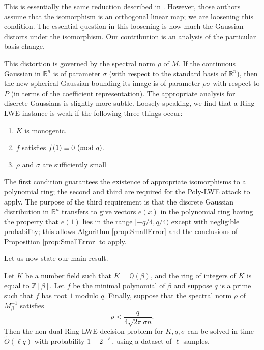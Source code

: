 \documentclass{llncs}
\newcommand{\QQ}{\mathbb{Q}}
\newcommand{\RR}{\mathbb{R}}
\newcommand{\ZZ}{\mathbb{Z}}
\newcommand{\MOD}[1]{~(\textup{mod}~#1)}
\renewcommand{\pmod}{\MOD}
\newcommand{\<}{\langle}
\renewcommand{\>}{\rangle}
\begin{document}
This is essentially the same reduction described in \cite{EHL}. However, those authors assume that the isomorphism is an orthogonal linear map; we are loosening this condition.
The essential question in this loosening is how much the Gaussian distorts under the isomorphism.  Our contribution is an analysis of the particular basis change.

This distortion is governed by the spectral norm $\rho$ of $M$.  If the continuous Gaussian in $\RR^n$ is of parameter $\sigma$ (with respect to the standard basis of $\RR^n$), then the new spherical Gaussian bounding its image is of parameter $\rho\sigma$ with respect to $P$ (in terms of the coefficient representation).  The appropriate analysis for discrete Gaussians is slightly more subtle.
Loosely speaking, we find that a Ring-LWE instance is weak if the following three things occur:

\begin{enumerate}
        \item \label{7monogenic}  $K$ is monogenic.
        \item \label{7root} $f$ satisfies $f(1) \equiv 0 \pmod q$.
        \item \label{7rho} $\rho$ and $\sigma$ are sufficiently small
\end{enumerate}

The first condition guarantees the existence of appropriate isomorphisms to a polynomial ring; the second and third are required for the Poly-LWE attack to apply.
The purpose of the third requirement is that the discrete Gaussian distribution in $\RR^n$ transfers to give vectors $e(x)$ in the polynomial ring having the property that $e(1)$ lies in the range $[-q/4,q/4)$ except with negligible probability; this allows Algorithm \ref{prop:SmallError} and the conclusions of Proposition \ref{prop:SmallError} to apply.


Let us now state our main result.

\begin{theorem}
        \label{thm:redux}
        Let $K$ be a number field such that $K = \QQ(\beta)$, and the ring of integers of $K$ is equal to $\ZZ[\beta]$.  Let $f$ be the minimal polynomial of $\beta$ and suppose $q$ is a prime such that $f$ has root $1$ modulo $q$.
        Finally, suppose that the spectral norm  $\rho$ of $M_\beta^{-1}$ satisfies
        \[
                \rho < \frac{q}{4\sqrt{2\pi}\sigma{n}}.
        \]
        Then the non-dual Ring-LWE decision problem for $K, q, \sigma$ can be solved in time $\widetilde{O}(\ell q)$ with probability $1 - 2^{-\ell}$, using a dataset of $\ell$ samples.
\end{theorem}
\end{document}
